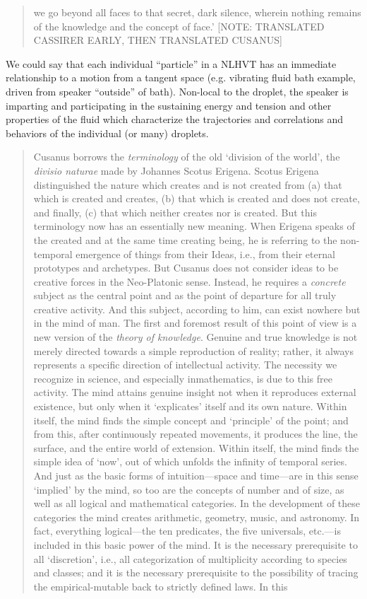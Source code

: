 \begin{quote}
we go beyond all faces to that secret, dark silence, wherein nothing remains of the knowledge and the concept of face.'  [NOTE: TRANSLATED CASSIRER EARLY, THEN TRANSLATED CUSANUS]  \citep[p. 31-33]{Cassirer1927}
\end{quote}

We could say that each individual ``particle'' in a NLHVT has an immediate relationship to a motion from a tangent space (e.g. vibrating fluid bath example, driven from speaker ``outside'' of bath).  Non-local to the droplet, the speaker is imparting and participating in the sustaining energy and tension and other properties of the fluid which characterize the trajectories and correlations and behaviors of the individual (or many) droplets.


\begin{quote}
    Cusanus borrows the \emph{terminology} of the old `division of the world', the \emph{divisio naturae} made by Johannes Scotus Erigena.  Scotus Erigena distinguished the nature which creates and is not created from (a) that which is created and creates, (b) that which is created and does not create, and finally, (c) that which neither creates nor is created.  But this terminology now has an essentially new meaning.  When Erigena speaks of the created and at the same time creating being, he is referring to the non-temporal emergence of things from their Ideas, i.e., from their eternal prototypes and archetypes.  But Cusanus does not consider ideas to be creative forces in the Neo-Platonic sense.  Instead, he requires a \emph{concrete} subject as the central point and as the point of departure for all truly creative activity.  And this subject, according to him, can exist nowhere but in the mind of man.  The first and foremost result of this point of view is a new version of the \emph{theory of knowledge}. Genuine and true knowledge is not merely directed towards a simple reproduction of reality; rather, it always represents a specific direction of intellectual activity.  The necessity we recognize in science, and especially inmathematics, is due to this free activity.  The mind attains genuine insight not when it reproduces external existence, but only when it `explicates' itself and its own nature.  Within itself, the mind finds the simple concept and `principle' of the point; and from this, after continuously repeated movements, it produces the line, the surface, and the entire world of extension.  Within itself, the mind finds the simple idea of `now', out of which unfolds the infinity of temporal series.  And just as the basic forms of intuition---space and time---are in this sense `implied' by the mind, so too are the concepts of number and of size, as well as all logical and mathematical categories.  In the development of these categories the mind creates arithmetic, geometry, music, and astronomy.  In fact, everything logical---the ten predicates, the five universals, etc.---is included in this basic power of the mind.  It is the necessary prerequisite to all `discretion', i.e., all categorization of multiplicity according to species and classes; and it is the necessary prerequisite to the possibility of tracing the empirical-mutable back to strictly defined laws.  In this 
\end{quote}
